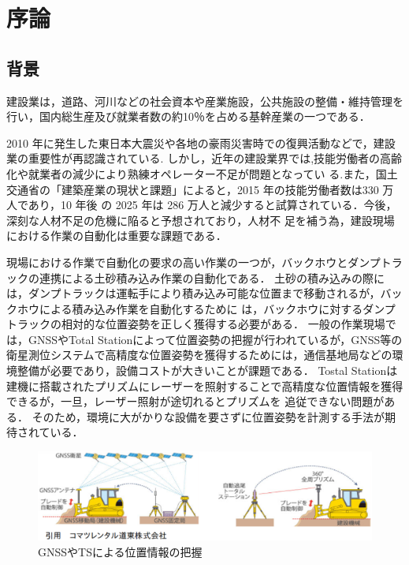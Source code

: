 \chapter{序論}
\thispagestyle{empty}
\label{Chap1}
\minitoc

\newpage

\section{背景}
\label{Background}
建設業は，道路、河川などの社会資本や産業施設，公共施設の整備・維持管理を行い，国内総生産及び就業者数の約10％を占める基幹産業の一つである．
\par 2010 年に発生した東日本大震災や各地の豪雨災害時での復興活動などで，建設業の重要性が再認識されている.
しかし，近年の建設業界では,技能労働者の高齢化や就業者の減少により熟練オペレーター不足が問題となってい
る.また，国土交通省の「建築産業の現状と課題」\cite{建設経済研究所2017}によると，2015 年の技能労働者数は330 万人であり，10 年後
の 2025 年は 286 万人と減少すると試算されている．今後，深刻な人材不足の危機に陥ると予想されており，人材不
足を補う為，建設現場における作業の自動化は重要な課題である．
\par
現場における作業で自動化の要求の高い作業の一つが，バックホウとダンプトラックの連携による土砂積み込み作業の自動化である．
土砂の積み込みの際には，ダンプトラックは運転手により積み込み可能な位置まで移動されるが，バックホウによる積み込み作業を自動化するために
は，バックホウに対するダンプトラックの相対的な位置姿勢を正しく獲得する必要がある．
一般の作業現場では，GNSSやTotal Stationによって位置姿勢の把握\cite{土井下2010}が行われているが，GNSS等の衛星測位システムで高精度な位置姿勢を獲得するためには，通信基地局などの環境整備が必要であり，設備コストが大きいことが課題である．
Tostal Stationは建機に搭載されたプリズムにレーザーを照射することで高精度な位置情報を獲得できるが，一旦，レーザー照射が途切れるとプリズムを
追従できない問題がある．
そのため，環境に大がかりな設備を要さずに位置姿勢を計測する手法が期待されている．

\begin{figure}[b]
 \begin{center}
 \includegraphics[width=1.0\columnwidth]{./chap1/fig/gnss.eps}
 \caption{GNSSやTSによる位置情報の把握}
 \label{fig:GNSS}
 \end{center}
\end{figure}

